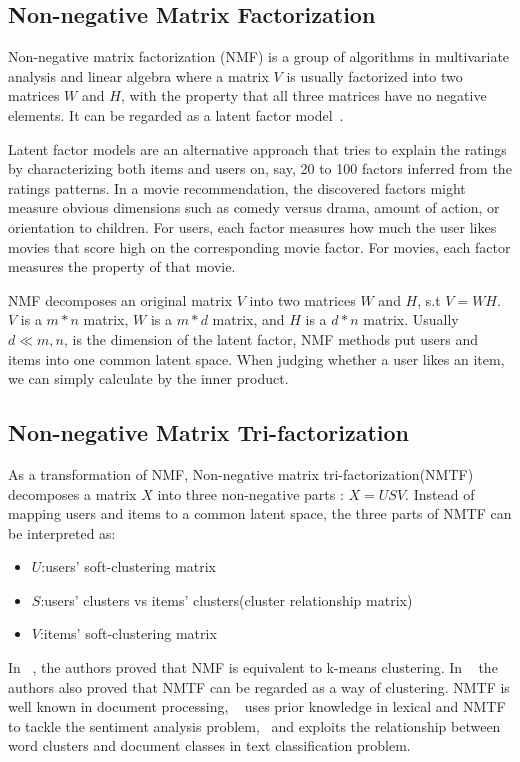 \hspace{0.05in}
\subsection{Non-negative Matrix Factorization}
Non-negative matrix factorization (NMF) is a group of algorithms in multivariate analysis and linear algebra where a matrix $V$ is usually factorized into two matrices $W$ and $H$, with the property that all three matrices have no negative elements. It can be regarded as a latent factor model~\cite{/computer/yehuda09matrix}.

Latent factor models are an alternative approach that tries to explain the ratings by characterizing both items and users on, say, 20 to 100 factors inferred from the ratings patterns. In a movie recommendation, the discovered factors might measure obvious dimensions such as comedy versus
drama, amount of action, or orientation to children. For users, each factor measures how much the user likes movies that score high on the corresponding movie factor. For movies, each factor measures the property of that movie.

NMF decomposes an original matrix $V$ into two matrices $W$ and $H$, s.t $V = WH$. $V$ is a $m*n$ matrix, $W$ is a $m*d$ matrix, and $H$ is a $d*n$ matrix. Usually $d \ll m,n$, is the dimension of the latent factor, NMF methods put users and items into one common latent space. When judging whether a user likes an item, we can simply calculate by the inner product.

\hspace{0.05in}
\subsection{Non-negative Matrix Tri-factorization}
As a transformation of NMF, Non-negative matrix tri-factorization(NMTF) decomposes a matrix $X$ into three non-negative parts : $X = USV$. Instead of mapping users and items to a common latent space, the three parts of NMTF can be interpreted as:
\begin{itemize}
\item $U$:users' soft-clustering matrix
\item $S$:users' clusters vs items' clusters(cluster relationship matrix)
\item $V$:items' soft-clustering matrix
\end{itemize}

In ~\cite{Ding05onthe}, the authors proved that NMF is equivalent to k-means clustering. In ~\cite{Ding06orthogonalnonnegative} the authors also proved that NMTF can be regarded as a way of clustering. NMTF is well known in document processing, ~\cite{Li:2009:NMT:1687878.1687914} uses prior knowledge in lexical and NMTF to tackle the sentiment analysis problem, ~\cite{Zhuang:2011:EAW:1952191.1952195}and exploits the relationship between word clusters and document classes in text classification problem.

